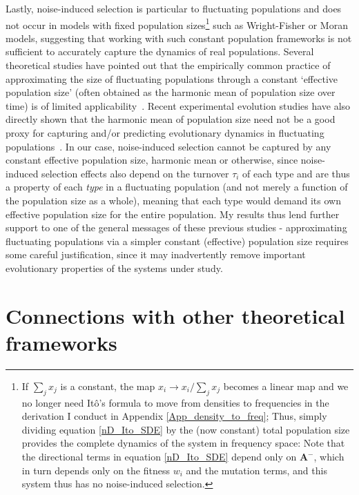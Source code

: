 Lastly, noise-induced selection is particular to fluctuating populations and does not occur in models with fixed population sizes\footnote{If $\sum_j x_j$ is a constant, the map $x_i \to x_i/\sum_j x_j$ becomes a linear map and we no longer need It\^o's formula to move from densities to frequencies in the derivation I conduct in Appendix \ref{App_density_to_freq}; Thus, simply dividing equation \eqref{nD_Ito_SDE} by the (now constant) total population size provides the complete dynamics of the system in frequency space: Note that the directional terms in equation \eqref{nD_Ito_SDE} depend only on $\mathbf{A}^-$, which in turn depends only on the fitness $w_i$ and the mutation terms, and this system thus has no noise-induced selection.} such as Wright-Fisher or Moran models, suggesting that working with such constant population frameworks is not sufficient to accurately capture the dynamics of real populations. Several theoretical studies have pointed out that the empirically common practice of approximating the size of fluctuating populations through a constant `effective population size' (often obtained as the harmonic mean of population size over time) is of limited applicability~\citep{gillespie_natural_1974,sjodin_meaning_2005,parsons_consequences_2010,iizuka_effective_2010,abu_awad_effects_2018,kuosmanen_turnover_2022}. Recent experimental evolution studies have also directly shown that the harmonic mean of population size need not be a good proxy for capturing and/or predicting evolutionary dynamics in fluctuating populations~\citep{chavhan_larger_2019}. In our case, noise-induced selection cannot be captured by any constant effective population size, harmonic mean or otherwise, since noise-induced selection effects also depend on the turnover $\tau_i$ of each type and are thus a property of each \emph{type} in a fluctuating population (and not merely a function of the population size as a whole), meaning that each type would demand its own effective population size for the entire population. My results thus lend further support to one of the general messages of these previous studies - approximating fluctuating populations via a simpler constant (effective) population size requires some careful justification, since it may inadvertently remove important evolutionary properties of the systems under study.

\section{Connections with other theoretical frameworks}

